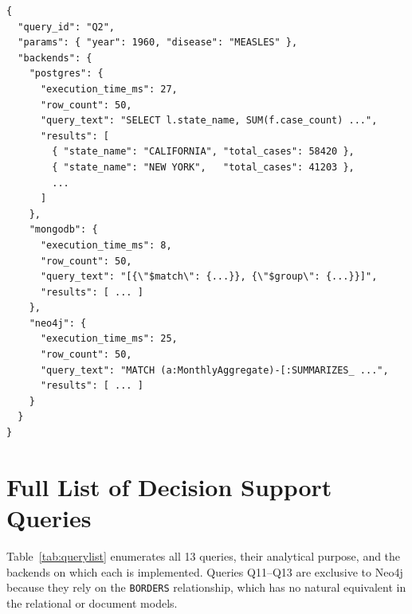 \documentclass[12pt,a4paper]{article}
\begin{document}
\begin{lstlisting}[language={}, caption={Abbreviated response from \texttt{POST /api/v1/compare} with \texttt{query\_id = Q2} and \texttt{params = \{"year": 1960, "disease": "MEASLES"\}}.}]
{
  "query_id": "Q2",
  "params": { "year": 1960, "disease": "MEASLES" },
  "backends": {
    "postgres": {
      "execution_time_ms": 27,
      "row_count": 50,
      "query_text": "SELECT l.state_name, SUM(f.case_count) ...",
      "results": [
        { "state_name": "CALIFORNIA", "total_cases": 58420 },
        { "state_name": "NEW YORK",   "total_cases": 41203 },
        ...
      ]
    },
    "mongodb": {
      "execution_time_ms": 8,
      "row_count": 50,
      "query_text": "[{\"$match\": {...}}, {\"$group\": {...}}]",
      "results": [ ... ]
    },
    "neo4j": {
      "execution_time_ms": 25,
      "row_count": 50,
      "query_text": "MATCH (a:MonthlyAggregate)-[:SUMMARIZES_ ...",
      "results": [ ... ]
    }
  }
}
\end{lstlisting}


\section{Full List of Decision Support Queries}
\label{app:querylist}

Table~\ref{tab:querylist} enumerates all 13 queries, their analytical purpose, and the backends on which each is implemented. Queries Q11--Q13 are exclusive to Neo4j because they rely on the \texttt{BORDERS} relationship, which has no natural equivalent in the relational or document models.
\end{document}
